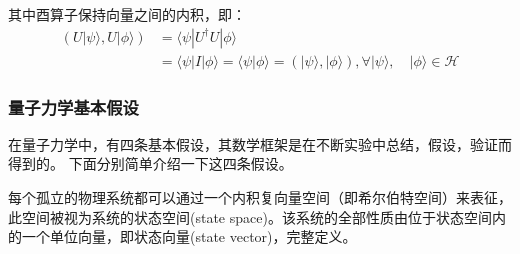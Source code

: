 其中酉算子保持向量之间的内积，即：
\begin{equation}
    \begin{split}
        (U|\psi\rangle, U|\phi\rangle) &= \langle \psi|U^\dagger U|\phi\rangle \\
        &= \langle \psi|I|\phi\rangle = \langle \psi|\phi\rangle = (|\psi\rangle, |\phi\rangle), \forall |\psi \rangle,\quad |\phi \rangle\in \mathcal{H}
    \end{split}
\end{equation}
\subsubsection*{量子力学基本假设}
在量子力学中，有四条基本假设，其数学框架是在不断实验中总结，假设，验证而得到的。
下面分别简单介绍一下这四条假设。
\begin{theorem}\citep{nielsen2010quantum}
    每个孤立的物理系统都可以通过一个内积复向量空间（即希尔伯特空间）来表征，此空间被视为系统的状态空间(state space)。该系统的全部性质由位于状态空间内的一个单位向量，即状态向量(state vector)，完整定义。
\end{theorem}

